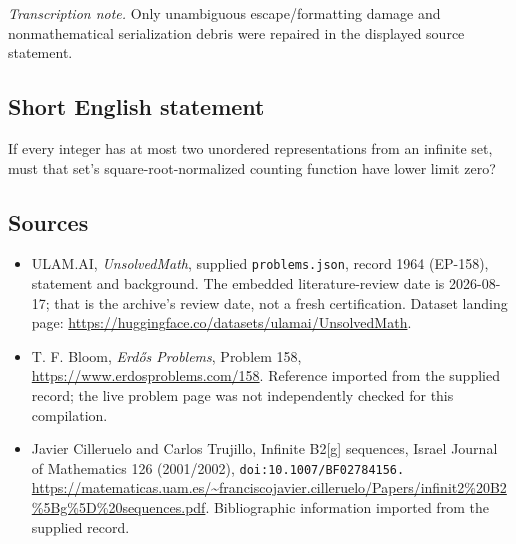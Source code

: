 \documentclass[11pt,a4paper]{article}
\begin{document}
{\small\emph{Transcription note.} Only unambiguous escape/formatting damage and nonmathematical serialization debris were repaired in the displayed source statement.}

\subsection{Short English statement}

If every integer has at most two unordered representations from an infinite set, must that set's square-root-normalized counting function have lower limit zero?

\subsection{Sources}

{\small

\begin{itemize}

\item[\hypertarget{source:1964:1}{S1}] ULAM.AI, \emph{UnsolvedMath}, supplied \texttt{problems.json}, record 1964 (EP-158), statement and background. The embedded literature-review date is 2026-08-17; that is the archive’s review date, not a fresh certification. Dataset landing page: \url{https://huggingface.co/datasets/ulamai/UnsolvedMath}.

\item[\hypertarget{source:1964:2}{S2}] T. F. Bloom, \emph{Erdős Problems}, Problem 158, \url{https://www.erdosproblems.com/158}. Reference imported from the supplied record; the live problem page was not independently checked for this compilation.

\item[\hypertarget{source:1964:3}{S3}] Javier Cilleruelo and Carlos Trujillo, Infinite B2[g] sequences, Israel Journal of Mathematics 126 (2001/2002), \nolinkurl{doi:10.1007/BF02784156.} \url{https://matematicas.uam.es/~franciscojavier.cilleruelo/Papers/infinit2%20B2%5Bg%5D%20sequences.pdf}. Bibliographic information imported from the supplied record.

\end{itemize}

}

\label{end:1964}
\end{document}
